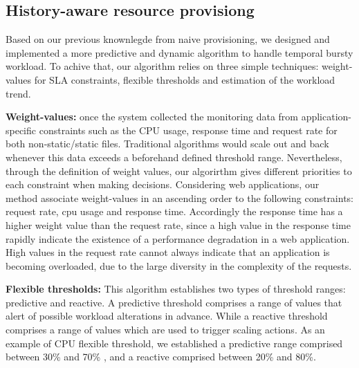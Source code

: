 

\subsection{History-aware resource provisiong}
Based on our previous knownlegde from naive provisioning, we designed and implemented a more predictive and dynamic algorithm to handle temporal bursty workload. To achive that, our algorithm relies on three simple techniques: weight-values for SLA constraints, flexible thresholds and  estimation of the workload trend. 


\textbf{Weight-values:} once the system collected the monitoring data from application-specific constraints such as the CPU usage, response time and request rate for both non-static/static files. Traditional algorithms would scale out and back whenever this data exceeds a beforehand defined threshold range. Nevertheless,  through the definition of weight values, our algorirthm gives different priorities to each constraint when making decisions. 
Considering web applications, our method associate weight-values in an ascending order to the following constraints: request rate, cpu usage and response time. Accordingly the response time has a higher weight value than the request rate, since a high value in the response time rapidly indicate the existence of a performance degradation in a web application. High values in the request rate cannot always indicate that an application is becoming overloaded, due to the large diversity in the complexity of the requests.

\textbf{Flexible thresholds:} This algorithm establishes two types of threshold ranges: predictive and reactive. A predictive threshold comprises a range of values that alert of possible workload alterations in advance. While a reactive threshold comprises a range of values which are used to trigger scaling actions. As an example of CPU flexible threshold, we established a predictive range comprised between 30\% and 70\% , and a reactive comprised between 20\% and 80\%.  

